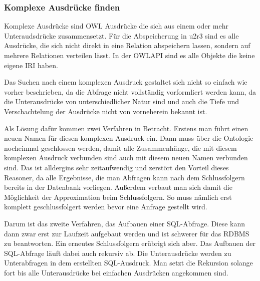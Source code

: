 \subsubsection{Komplexe Ausdrücke finden}

Komplexe Ausdrücke sind OWL Ausdrücke die sich aus einem oder mehr Unteraudsdrücke zusammensetzt. Für die Abspeicherung in u2r3 sind es alle Ausdrücke, die sich nicht direkt in eine Relation abspeichern lassen, sondern auf mehrere Relationen verteilen lässt. In der OWLAPI sind es alle Objekte die keine eigene IRI haben.

Das Suchen nach einem komplexen Ausdruck gestaltet sich nicht so einfach wie vorher beschrieben, da die Abfrage nicht vollständig vorformliert werden kann, da die Unterausdrücke von unterschiedlicher Natur sind und auch die Tiefe und Verschachtelung der Ausdrücke nicht von vorneherein bekannt ist.

Als Lösung dafür kommen zwei Verfahren in Betracht. Erstens man führt einen neuen Namen für diesen komplexen Ausdruck ein. Dann muss über die Ontologie nocheinmal geschlossen werden, damit alle Zusammenhänge, die mit diesem komplexen Ausdruck verbunden sind auch mit diesem neuen Namen verbunden sind. Das ist alldergins sehr zeitaufwendig und zerstört den Vorteil dieses Reasoner, da alle Ergebnisse, die man Abfragen kann nach dem Schlussfolgern bereits in der Datenbank vorliegen. Außerdem verbaut man sich damit die Möglichkeit der Approximation beim Schlussfolgern. So muss nämlich erst komplett geschlussfolgert werden bevor eine Anfrage gestellt wird.

Darum ist das zweite Verfahren, das Aufbauen einer SQL-Abfrage. Diese kann dann zwar erst zur Laufzeit aufgebaut werden und ist schwerer für das RDBMS zu beantworten. Ein erneutes Schlussfolgern erübrigt sich aber. Das Aufbauen der SQL-Abfrage läuft dabei auch rekursiv ab. Die Unterausdrücke werden zu Unterabfragen in dem erstellten SQL-Ausdruck. Man setzt die Rekursion solange fort bis alle Unterausdrücke bei einfachen Ausdrücken angekommen sind.